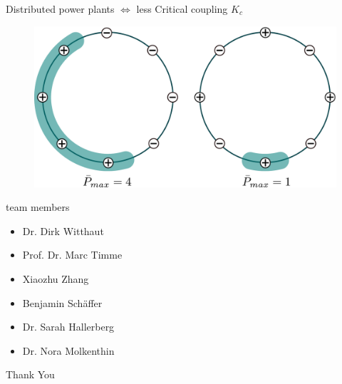 \documentclass[xcolor=x11names,compress]{beamer}
\newcommand{\hlc}[1]{\textcolor{MpiGreen}{#1}}
\renewcommand{\(}{\begin{columns}}
\renewcommand{\)}{\end{columns}}
\newcommand{\<}[1]{\begin{column}{#1}}
\renewcommand{\>}{\end{column}}
\begin{document}
\begin{frame}{Distributed power plants $\Leftrightarrow$ less Critical 
coupling $K_c$}

\begin{figure}
\begin{center}
\includegraphics[width=0.9\columnwidth]{pmax_compare}
\end{center}
\end{figure}
\end{frame}


\begin{frame}{team members}
\begin{itemize}
\item Dr. Dirk Witthaut
\item Prof. Dr. Marc Timme
\item Xiaozhu Zhang
\item Benjamin Sch\"affer
\item Dr. Sarah Hallerberg
\item Dr. Nora Molkenthin
\end{itemize}

\end{frame}



\begin{frame}
\begin{center}
\Huge{\hlc{Thank You}}
\end{center}

\end{frame}
\end{document}
